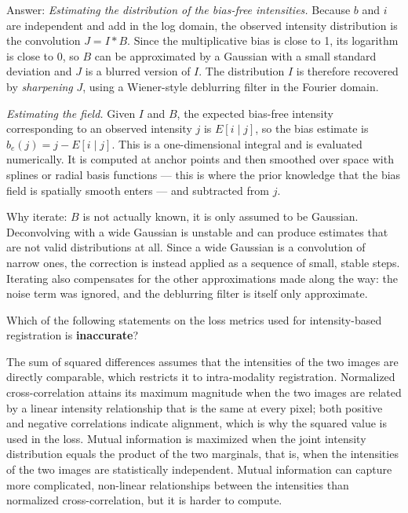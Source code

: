 \documentclass[11pt]{exam}
\newcommand{\answerspace}[1]{\ifprintanswers\else\vspace{#1}\fi}
\begin{document}
\begin{questions}
\begin{solution}
  Answer: \emph{Estimating the distribution of the bias-free intensities.} Because $b$ and $i$
  are independent and add in the log domain, the observed intensity distribution is the
  convolution $J = I * B$. Since the multiplicative bias is close to 1, its logarithm is close to
  0, so $B$ can be approximated by a Gaussian with a small standard deviation and $J$ is a blurred
  version of $I$. The distribution $I$ is therefore recovered by \emph{sharpening} $J$, using a
  Wiener-style deblurring filter in the Fourier domain.

  \emph{Estimating the field.} Given $I$ and $B$, the expected bias-free intensity corresponding
  to an observed intensity $j$ is $E[i \mid j]$, so the bias estimate is $b_e(j) = j - E[i \mid j]$.
  This is a one-dimensional integral and is evaluated numerically. It is computed at anchor points
  and then smoothed over space with splines or radial basis functions --- this is where the prior
  knowledge that the bias field is spatially smooth enters --- and subtracted from $j$.

  Why iterate: $B$ is not actually known, it is only assumed to be Gaussian. Deconvolving with a
  wide Gaussian is unstable and can produce estimates that are not valid distributions at all.
  Since a wide Gaussian is a convolution of narrow ones, the correction is instead applied as a
  sequence of small, stable steps. Iterating also compensates for the other approximations made
  along the way: the noise term was ignored, and the deblurring filter is itself only approximate.
\end{solution}
\answerspace{7.5cm}

\question
Which of the following statements on the loss metrics used for intensity-based registration is
\textbf{inaccurate}?

\begin{choices}
  \choice The sum of squared differences assumes that the intensities of the two images are
  directly comparable, which restricts it to intra-modality registration.
  \choice Normalized cross-correlation attains its maximum magnitude when the two images are
  related by a linear intensity relationship that is the same at every pixel; both positive and
  negative correlations indicate alignment, which is why the squared value is used in the loss.
  \choice Mutual information is maximized when the joint intensity distribution equals the product
  of the two marginals, that is, when the intensities of the two images are statistically
  independent.
  \choice Mutual information can capture more complicated, non-linear relationships between the
  intensities than normalized cross-correlation, but it is harder to compute.
\end{choices}


\end{questions}
\end{document}
